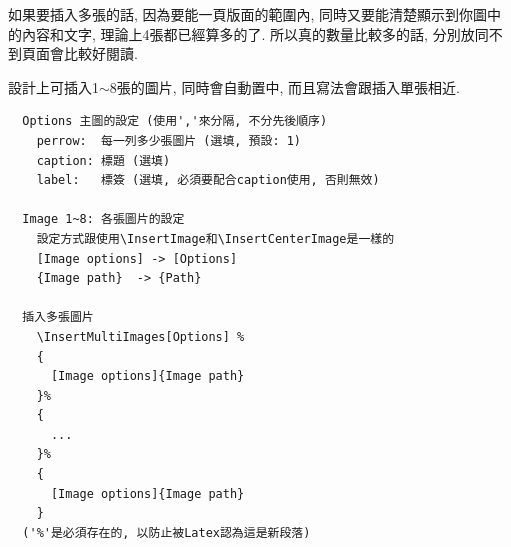 \newpage
{}

  如果要插入多張的話, 因為要能一頁版面的範圍內, 同時又要能清楚顯示到你圖中的內容和文字, 理論上4張都已經算多的了. 所以真的數量比較多的話, 分別放同不到頁面會比較好閱讀.

  設計上可插入1$\sim$8張的圖片, 同時會自動置中, 而且寫法會跟插入單張相近.

  \begin{framed}
  \begin{verbatim}
  Options 主圖的設定 (使用','來分隔, 不分先後順序)
    perrow:  每一列多少張圖片 (選填, 預設: 1)
    caption: 標題 (選填)
    label:   標簽 (選填, 必須要配合caption使用, 否則無效)

  Image 1~8: 各張圖片的設定
    設定方式跟使用\InsertImage和\InsertCenterImage是一樣的
    [Image options] -> [Options]
    {Image path}  -> {Path}

  插入多張圖片
    \InsertMultiImages[Options] %
    {
      [Image options]{Image path}
    }%
    {
      ...
    }%
    {
      [Image options]{Image path}
    }
  ('%'是必須存在的, 以防止被Latex認為這是新段落)
  \end{verbatim}
  \end{framed}

  \newpage

